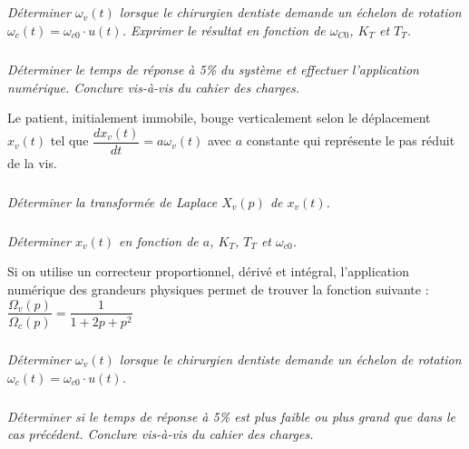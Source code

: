 \documentclass[11pt,oneside]{article}
\begin{document}
\subparagraph{}
\textit{Déterminer $\omega_v(t)$ lorsque le chirurgien dentiste demande un échelon de rotation $\omega_c(t)=\omega_{c0}\cdot u(t)$. Exprimer le résultat en fonction de $\omega_{C0}$, $K_T$ et $T_T$.}

\subparagraph{}
\textit{Déterminer le temps de réponse à 5\% du système et effectuer l'application numérique. Conclure vis-à-vis du cahier des charges.}

Le patient, initialement immobile, bouge verticalement selon le déplacement $x_v(t)$ tel que $\dfrac{dx_v(t)}{dt} = a\omega_v(t)$ avec $a$ constante qui représente le pas réduit de la vis. 

\subparagraph{}
\textit{Déterminer la transformée de Laplace $X_v(p)$ de $x_v(t)$.}

\subparagraph{}
\textit{Déterminer $x_v(t)$ en fonction de $a$, $K_T$, $T_T$ et $\omega_{c0}$.}


Si on utilise un correcteur proportionnel, dérivé et intégral, l'application numérique des grandeurs physiques permet de trouver la fonction suivante : $\dfrac{\Omega_v(p)}{\Omega_c(p)} = \dfrac{1}{1+2p+p^2}
$

\subparagraph{}
\textit{Déterminer $\omega_v(t)$ lorsque le chirurgien dentiste demande un échelon de rotation $\omega_c(t)=\omega_{c0}\cdot u(t)$.}

\subparagraph{}
\textit{Déterminer si le temps de réponse à 5\% est plus faible  ou plus grand que dans le cas précédent. Conclure vis-à-vis du cahier des charges.}
\end{document}
